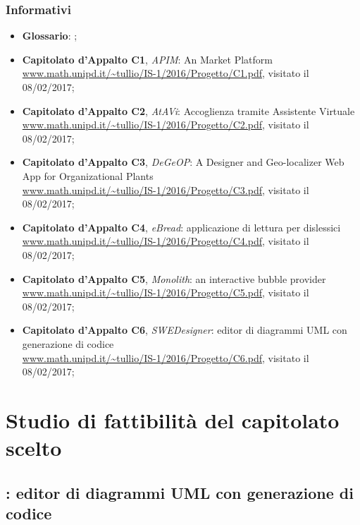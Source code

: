 		\subsubsection{Informativi}
		\begin{itemize}
			\item \textbf{Glossario}: \Glossario;
			\item \textbf{Capitolato d'Appalto C1}, \emph{APIM}: An  Market Platform \\
			\url{www.math.unipd.it/~tullio/IS-1/2016/Progetto/C1.pdf}, visitato il 08/02/2017;
			\item \textbf{Capitolato d'Appalto C2}, \emph{AtAVi}: Accoglienza tramite Assistente Virtuale \\
			\url{www.math.unipd.it/~tullio/IS-1/2016/Progetto/C2.pdf}, visitato il 08/02/2017;
			\item \textbf{Capitolato d'Appalto C3}, \emph{DeGeOP}: A Designer and Geo-localizer Web App for Organizational Plants \\
			\url{www.math.unipd.it/~tullio/IS-1/2016/Progetto/C3.pdf}, visitato il 08/02/2017;
			\item \textbf{Capitolato d'Appalto C4}, \emph{eBread}: applicazione di lettura per dislessici \\
			\url{www.math.unipd.it/~tullio/IS-1/2016/Progetto/C4.pdf}, visitato il 08/02/2017;
			\item \textbf{Capitolato d'Appalto C5}, \emph{Monolith}: an interactive bubble provider \\
			\url{www.math.unipd.it/~tullio/IS-1/2016/Progetto/C5.pdf}, visitato il 08/02/2017;
			\item \textbf{Capitolato d'Appalto C6}, \emph{SWEDesigner}: editor di diagrammi UML con generazione di codice \\
			\url{www.math.unipd.it/~tullio/IS-1/2016/Progetto/C6.pdf}, visitato il 08/02/2017;
		\end{itemize}


	



\section{Studio di fattibilità del capitolato scelto}
	\subsection{\proj: editor di diagrammi UML con generazione di codice}

